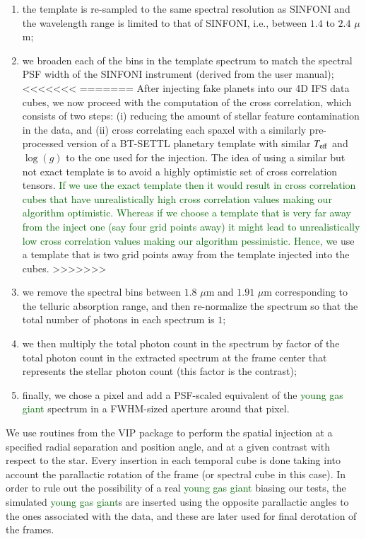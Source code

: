 \documentclass{aa}
\newcommand{\newchange}[1]{\textcolor{darkgreen}{#1}}
\begin{document}
{\begin{enumerate}
\subsection{Producing cross correlation cubes}\label{sec:specpreproc}
>>>>>>>
    \item the template is re-sampled to the same spectral resolution as SINFONI and the wavelength range is limited to that of SINFONI, i.e., between $1.4$ to $2.4$ $\mu$m;
    \item we broaden each of the bins in the template spectrum to match the spectral PSF width of the SINFONI instrument (derived from the user manual);
<<<<<<<
=======
After injecting fake planets into our 4D IFS data cubes, we now proceed with the computation of the cross correlation, which consists of two steps: (i) reducing the amount of stellar feature contamination in the data, and (ii) cross correlating each spaxel with a similarly pre-processed version of a BT-SETTL planetary template with similar $T_{\rm eff}$ and $\log(g)$ to the one used for the injection.
The idea of using a similar but not exact template is to avoid a highly optimistic set of cross correlation tensors.
\newchange{If we use the exact template then it would result in cross correlation cubes that have unrealistically high cross correlation values making our algorithm optimistic. 
Whereas if we choose a template that is very far away from the inject one (say four grid points away) it might lead to unrealistically low cross correlation values making our algorithm pessimistic.}
\newchange{Hence, w}e use a template that is two grid points away from the template injected into the cubes.
>>>>>>>
    \item we remove the spectral bins between $1.8$ $\mu$m and $1.91$ $\mu$m corresponding to the telluric absorption range, and then re-normalize the spectrum so that the total number of photons in each spectrum is $1$;
    \item we then multiply the total photon count in the spectrum by factor of the total photon count in the extracted spectrum at the frame center that represents the stellar photon count (this factor is the contrast);
    \item finally, we chose a pixel and add a PSF-scaled equivalent of the \newchange{young gas giant} spectrum in a FWHM-sized aperture around that pixel.
\end{enumerate}
We use routines from the \textsc{VIP} package to perform the spatial injection at a specified radial separation and position angle, and at a given contrast with respect to the star.
Every insertion in each temporal cube is done taking into account the parallactic rotation of the frame (or spectral cube in this case).
In order to rule out the possibility of a real \newchange{young gas giant} biasing our tests, the simulated \newchange{young gas giant}s are inserted using the opposite parallactic angles to the ones associated with the data, and these are later used for final derotation of the frames.


}
\end{document}
